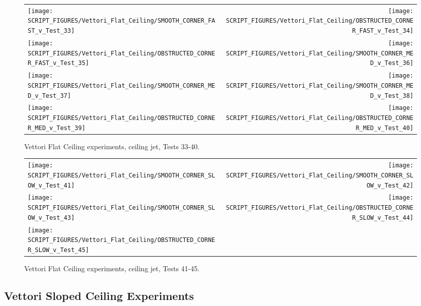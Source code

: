 \begin{figure}[p]
\begin{tabular*}{\textwidth}{l@{\extracolsep{\fill}}r}
\texttt{[image: SCRIPT\_FIGURES/Vettori\_Flat\_Ceiling/SMOOTH\_CORNER\_FAST\_v\_Test\_33]} &
\texttt{[image: SCRIPT\_FIGURES/Vettori\_Flat\_Ceiling/OBSTRUCTED\_CORNER\_FAST\_v\_Test\_34]} \\
\texttt{[image: SCRIPT\_FIGURES/Vettori\_Flat\_Ceiling/OBSTRUCTED\_CORNER\_FAST\_v\_Test\_35]} &
\texttt{[image: SCRIPT\_FIGURES/Vettori\_Flat\_Ceiling/SMOOTH\_CORNER\_MED\_v\_Test\_36]} \\
\texttt{[image: SCRIPT\_FIGURES/Vettori\_Flat\_Ceiling/SMOOTH\_CORNER\_MED\_v\_Test\_37]} &
\texttt{[image: SCRIPT\_FIGURES/Vettori\_Flat\_Ceiling/SMOOTH\_CORNER\_MED\_v\_Test\_38]} \\
\texttt{[image: SCRIPT\_FIGURES/Vettori\_Flat\_Ceiling/OBSTRUCTED\_CORNER\_MED\_v\_Test\_39]} &
\texttt{[image: SCRIPT\_FIGURES/Vettori\_Flat\_Ceiling/OBSTRUCTED\_CORNER\_MED\_v\_Test\_40]} \\
\end{tabular*}
\caption{Vettori Flat Ceiling experiments, ceiling jet, Tests 33-40.}
\label{Vettori_5}
\end{figure}

\begin{figure}[p]
\begin{tabular*}{\textwidth}{l@{\extracolsep{\fill}}r}
\texttt{[image: SCRIPT\_FIGURES/Vettori\_Flat\_Ceiling/SMOOTH\_CORNER\_SLOW\_v\_Test\_41]} &
\texttt{[image: SCRIPT\_FIGURES/Vettori\_Flat\_Ceiling/SMOOTH\_CORNER\_SLOW\_v\_Test\_42]} \\
\texttt{[image: SCRIPT\_FIGURES/Vettori\_Flat\_Ceiling/SMOOTH\_CORNER\_SLOW\_v\_Test\_43]} &
\texttt{[image: SCRIPT\_FIGURES/Vettori\_Flat\_Ceiling/OBSTRUCTED\_CORNER\_SLOW\_v\_Test\_44]} \\
\texttt{[image: SCRIPT\_FIGURES/Vettori\_Flat\_Ceiling/OBSTRUCTED\_CORNER\_SLOW\_v\_Test\_45]} \\
\end{tabular*}
\caption{Vettori Flat Ceiling experiments, ceiling jet, Tests 41-45.}
\label{Vettori_6}
\end{figure}


\clearpage

\subsection{Vettori Sloped Ceiling Experiments}
\label{Vettori_Sloped_Results}


